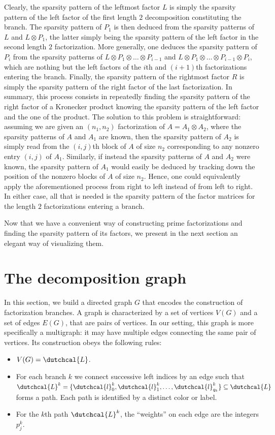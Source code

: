 \documentclass{article}
\numberwithin{equation}{section}
\newcommand{\lcal}{\dutchcal{l}}
\theoremstyle{definition}
\begin{document}
Clearly, the sparsity pattern of the leftmost factor $L$ is simply the sparsity pattern of the left factor of the first length $2$ decomposition constituting the branch. The sparsity pattern of $P_1$ is then deduced from the sparsity patterns of $L$ and $L \otimes P_1$, the latter simply being the sparsity pattern of the left factor in the second length $2$ factorization. More generally, one deduces the sparsity pattern of $P_{i}$ from the sparsity patterns of $L \otimes P_1 \otimes \dots \otimes P_{i-1}$ and $L \otimes P_1 \otimes \dots \otimes P_{i-1} \otimes P_{i}$, which are nothing but the left factors of the $i$th and $(i+1)$th factorizations entering the branch. Finally, the sparsity pattern of the rightmost factor $R$ is simply the sparsity pattern of the right factor of the last factorization. In summary, this process consists in repeatedly finding the sparsity pattern of the right factor of a Kronecker product knowing the sparsity pattern of the left factor and the one of the product. The solution to this problem is straightforward: assuming we are given an $(n_1,n_2)$ factorization of $A = A_1 \otimes A_2$, where the sparsity patterns of $A$ and $A_1$ are known, then the sparsity pattern of $A_2$ is simply read from the $(i,j)$th block of $A$ of size $n_2$ corresponding to any nonzero entry $(i,j)$ of $A_1$. Similarly, if instead the sparsity patterns of $A$ and $A_2$ were known, the sparsity pattern of $A_1$ would easily be deduced by tracking down the position of the nonzero blocks of $A$ of size $n_2$. Hence, one could equivalently apply the aforementioned process from right to left instead of from left to right. In either case, all that is needed is the sparsity pattern of the factor matrices for the length $2$ factorizations entering a branch.

Now that we have a convenient way of constructing prime factorizations and finding the sparsity pattern of its factors, we present in the next section an elegant way of visualizing them.

\section{The decomposition graph}
\label{se: decomposition_graph}
In this section, we build a directed graph $G$ that encodes the construction of factorization branches. A graph is characterized by a set of vertices $V(G)$ and a set of edges $E(G)$, that are pairs of vertices. In our setting, this graph is more specifically a multigraph: it may have multiple edges connecting the same pair of vertices. Its construction obeys the following rules:
\begin{itemize}[noitemsep]
    \item $V(G)=\dutchcal{L}$.
    \item For each branch $k$ we connect successive left indices by an edge such that $\dutchcal{L}^k = \{\lcal_0^k,\lcal_1^k,\dots,\lcal_{q_k}^k\} \subseteq \dutchcal{L}$ forms a path. Each path is identified by a distinct color or label.
    \item For the $k$th path $\dutchcal{L}^k$, the ``weights'' on each edge are the integers $p_j^k$.
\end{itemize}
\end{document}
